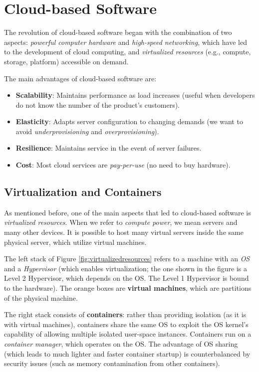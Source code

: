 \chapter{Cloud-based Software}

The revolution of cloud-based software began with the combination of two aspects: \emph{powerful computer hardware} and \emph{high-speed networking}, which have led to the development of cloud computing, and \emph{virtualized resources} (e.g., compute, storage, platform) accessible on demand.

The main advantages of cloud-based software are:
\begin{itemize}
    \item \textbf{Scalability}: Maintains performance as load increases (useful when developers do not know the number of the product's customers).
    \item \textbf{Elasticity}: Adapts server configuration to changing demands (we want to avoid \emph{underprovisioning} and \emph{overprovisioning}).
    \item \textbf{Resilience}: Maintains service in the event of server failures.
    \item \textbf{Cost}: Most cloud services are \emph{pay-per-use} (no need to buy hardware).
\end{itemize}

\section{Virtualization and Containers}

As mentioned before, one of the main aspects that led to cloud-based software is \emph{virtualized resources}. When we refer to \emph{compute power}, we mean servers and many other devices. It is possible to host many virtual servers inside the same physical server, which utilize virtual machines.

The left stack of Figure \ref{fig:virtualizedresources} refers to a machine with an \emph{OS} and a \emph{Hypervisor} (which enables virtualization; the one shown in the figure is a Level 2 Hypervisor, which depends on the OS. The Level 1 Hypervisor is bound to the hardware). The orange boxes are \textbf{virtual machines}, which are partitions of the physical machine.

The right stack consists of \textbf{containers}: rather than providing isolation (as it is with virtual machines), containers share the same OS to exploit the OS kernel’s capability of allowing multiple isolated user-space instances. Containers run on a \emph{container manager}, which operates on the OS. The advantage of OS sharing (which leads to much lighter and faster container startup) is counterbalanced by security issues (such as memory contamination from other containers).


